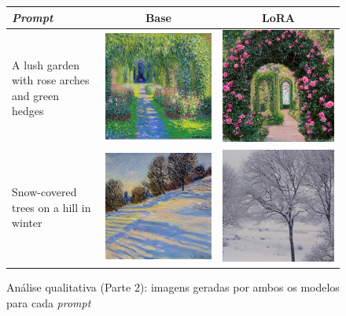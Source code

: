 \begin{figure}[htb]
\centering
\caption{Análise qualitativa (Parte 2): imagens geradas por ambos os modelos para cada \textit{prompt}}
\label{fig:analise_qualitativa_part2}

\begin{tabular}{p{4.5cm}c@{\hskip 0.5cm}c}
\toprule
\textbf{\textit{Prompt}} & \textbf{Base} & \textbf{LoRA} \\
\midrule

A lush garden with rose arches and green hedges &
\includegraphics[width=0.25\linewidth]{modelo_base/06_a_lush_garden_with_rose_arches.png} &
\includegraphics[width=0.25\linewidth]{modelo_lora/06_a_lush_garden_with_rose_arches.png} \\

Snow-covered trees on a hill in winter &
\includegraphics[width=0.25\linewidth]{modelo_base/07_snow-covered_trees_on_a_hill_i.png} &
\includegraphics[width=0.25\linewidth]{modelo_lora/07_snow-covered_trees_on_a_hill_i.png} \\


\end{tabular}
\end{figure}
